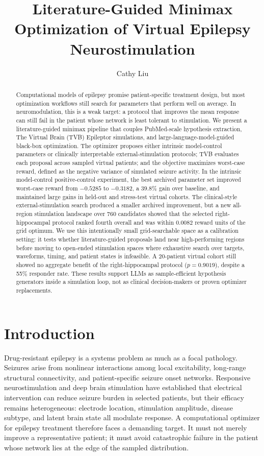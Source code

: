\documentclass{article}
\title{Literature-Guided Minimax Optimization of Virtual Epilepsy Neurostimulation}
\author{
  Cathy Liu
}
\begin{document}
\maketitle

\begin{abstract}
Computational models of epilepsy promise patient-specific treatment design, but most optimization workflows still search for parameters that perform well on average. In neuromodulation, this is a weak target: a protocol that improves the mean response can still fail in the patient whose network is least tolerant to stimulation. We present a literature-guided minimax pipeline that couples PubMed-scale hypothesis extraction, The Virtual Brain (TVB) Epileptor simulations, and large-language-model-guided black-box optimization. The optimizer proposes either intrinsic model-control parameters or clinically interpretable external-stimulation protocols; TVB evaluates each proposal across sampled virtual patients; and the objective maximizes worst-case reward, defined as the negative variance of simulated seizure activity. In the intrinsic model-control positive-control experiment, the best archived parameter set improved worst-case reward from $-0.5285$ to $-0.3182$, a $39.8\%$ gain over baseline, and maintained large gains in held-out and stress-test virtual cohorts. The clinical-style external-stimulation search produced a smaller archived improvement, but a new all-region stimulation landscape over 760 candidates showed that the selected right-hippocampal protocol ranked fourth overall and was within $0.0082$ reward units of the grid optimum. We use this intentionally small grid-searchable space as a calibration setting: it tests whether literature-guided proposals land near high-performing regions before moving to open-ended stimulation spaces where exhaustive search over targets, waveforms, timing, and patient states is infeasible. A 20-patient virtual cohort still showed no aggregate benefit of the right-hippocampal protocol ($p=0.9019$), despite a 55\% responder rate. These results support LLMs as sample-efficient hypothesis generators inside a simulation loop, not as clinical decision-makers or proven optimizer replacements.
\end{abstract}

\section{Introduction}
Drug-resistant epilepsy is a systems problem as much as a focal pathology. Seizures arise from nonlinear interactions among local excitability, long-range structural connectivity, and patient-specific seizure onset networks. Responsive neurostimulation and deep brain stimulation have established that electrical intervention can reduce seizure burden in selected patients, but their efficacy remains heterogeneous: electrode location, stimulation amplitude, disease subtype, and latent brain state all modulate response. A computational optimizer for epilepsy treatment therefore faces a demanding target. It must not merely improve a representative patient; it must avoid catastrophic failure in the patient whose network lies at the edge of the sampled distribution.
\end{document}
